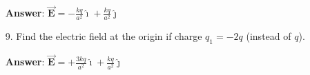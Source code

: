 \documentclass{article}
\newcommand{\ds}[0]{\displaystyle}
\newcommand{\ihat}[0]{\hat{\boldsymbol{\imath}}}
\newcommand{\jhat}[0]{\hat{\boldsymbol{\jmath}}}
\newcommand{\bfvec}[1]{\vec{\mathbf{#1}}}
\begin{document}
\begin{enumerate}
            \ifsolutions
            {\bf Answer}: $\ds\bfvec{E}=-\frac{kq}{a^2}\ihat+\frac{kq}{a^2}\jhat$
            \else

            \vskip 72pt
            \fi

  \item[9.] Find the electric field at the origin if charge $q_1=-2q$ (instead of $q$).

            \ifsolutions
            {\bf Answer}: $\ds\bfvec{E}=+\frac{3kq}{a^2}\ihat+\frac{kq}{a^2}\jhat$
            \else

            \vskip 72pt
            \fi

\end{enumerate}
\end{document}
